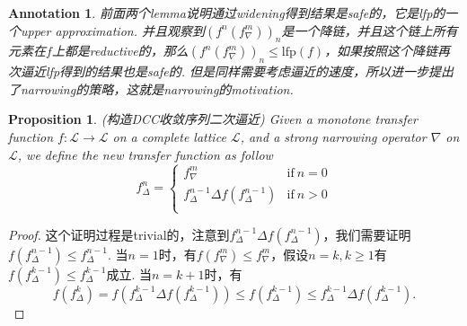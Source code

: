 \documentclass{article}
\newtheorem{proposition}[theorem]{Proposition}
\newtheorem{annotation}[theorem]{Annotation}
\newcommand*{\xfunc}[4]{{#2}\colon{#3}{#1}{#4}}
\newcommand*{\func}[3]{\xfunc{\to}{#1}{#2}{#3}}
\begin{document}
\begin{annotation} \rm
前面两个lemma说明通过widening得到结果是safe的，它是lfp的一个upper approximation. 并且观察到$(f^n(f^m_\nabla))_n$是一个降链，并且这个链上所有元素在$f$上都是reductive的，那么$(f^n(f^m_\nabla))_n \leq \text{lfp}(f)$，如果按照这个降链再次逼近lfp得到的结果也是safe的. 但是同样需要考虑逼近的速度，所以进一步提出了narrowing的策略，这就是narrowing的motivation.
\end{annotation}

\begin{proposition}
\rm {\color{red}(构造DCC收敛序列二次逼近)} Given a monotone transfer function $\func{f}{\mathcal{L}}{\mathcal{L}}$ on a complete lattice $\mathcal{L}$, and a strong narrowing operator $\nabla$ on $\mathcal{L}$, we define the new transfer function as follow
$$
f^n_\Delta = \left\{ \begin{array}{ll} 
f^m_\nabla & \text{if}~n = 0 \\
f^{n-1}_\Delta \Delta f(f^{n-1}_\Delta) & \text{if}~n > 0\\
\end{array} \right.
$$
\end{proposition}

\begin{proof}
这个证明过程是trivial的，注意到$f^{n-1}_\Delta \Delta f(f^{n-1}_\Delta)$，我们需要证明$f(f^{n-1}_\Delta) \leq f^{n-1}_\Delta$. 当$n=1$时，有$f(f^m_\nabla) \leq f^m_\nabla$，假设$n=k, k \geq 1$有$f(f^{k-1}_\Delta) \leq f^{k-1}_\Delta$成立. 当$n=k+1$时，有
$$
f(f^k_\Delta)= f(f^{k-1}_\Delta \Delta f(f^{k-1}_\Delta)) \leq f(f^{k-1}_\Delta) \leq f^{k-1}_\Delta \Delta f(f^{k-1}_\Delta).
$$
\end{proof}
\end{document}
